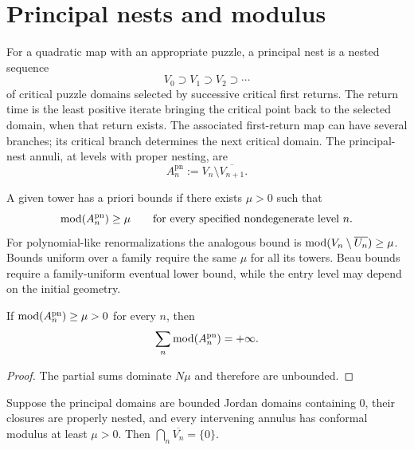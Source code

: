 \section{Principal nests and modulus}

\begin{definition}
\label{def:principal-nest}
For a quadratic map with an appropriate puzzle, a principal nest is a
nested sequence
\[
 V_0\supset V_1\supset V_2\supset\cdots
\]
of critical puzzle domains selected by successive critical first
returns.  The return time is the least positive iterate bringing the
critical point back to the selected domain, when that return exists.
The associated first-return map can have several branches; its
critical branch determines the next critical domain.
The principal-nest annuli, at levels with proper nesting, are
\[
 A_n^{\mathrm{pn}}:=V_n\setminus\overline{V_{n+1}}.
\]
\end{definition}

\begin{definition}
\label{def:apriori-bounds}
A given tower has a priori bounds if there exists $\mu>0$ such that
\[
 \operatorname{mod}(A_n^{\mathrm{pn}})\ge\mu
\qquad\text{for every specified nondegenerate level }n.
\]
For polynomial-like renormalizations the analogous bound is
$\operatorname{mod}(V_n\setminus\overline{U_n})\ge\mu$.
Bounds uniform over a family require the same $\mu$ for all its
towers.  Beau bounds require a family-uniform eventual lower bound,
while the entry level may depend on the initial geometry.
\end{definition}

\begin{lemma}
\label{lem:uniform-bound-divergence}
If $\operatorname{mod}(A_n^{\mathrm{pn}})\ge\mu>0$ for every $n$, then
\[
 \sum_n\operatorname{mod}(A_n^{\mathrm{pn}})=+\infty.
\]
\end{lemma}

\begin{proof}
The partial sums dominate $N\mu$ and therefore are unbounded.
\end{proof}

\begin{theorem}
\label{thm:renormalization-to-puzzle}
Suppose the principal domains are bounded Jordan domains containing
$0$, their closures are properly nested, and every intervening annulus
has conformal modulus at least $\mu>0$.  Then
$\bigcap_n\overline{V_n}=\{0\}$.
\end{theorem}

